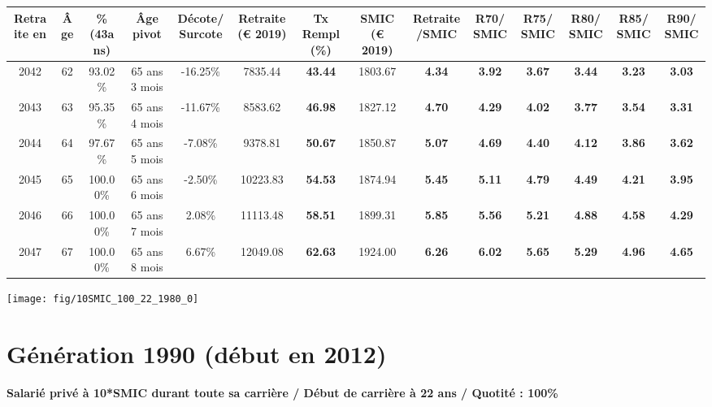\begin{adjustbox}{max width=\textwidth} 
\begin{tabular}[htb]{|c|c||c|c|c||c|c||c|c||c|c|c|c|c|} 
\hline 
 Retraite en &  Âge &  \%(43ans) &  Âge pivot &  Décote/Surcote &  Retraite (\euro{} 2019) &  Tx Rempl(\%) &  SMIC (\euro{} 2019) &  Retraite/SMIC &  R70/SMIC &  R75/SMIC &  R80/SMIC &  R85/SMIC &  R90/SMIC \\ 
\hline \hline 
 2042 &  62 &  93.02\% &  65 ans 3 mois &  -16.25\% &  7835.44 &  {\bf 43.44} &  1803.67 &  {\bf 4.34} &  {\bf 3.92} &  {\bf 3.67} &  {\bf 3.44} &  {\bf 3.23} &  {\bf 3.03} \\ 
\hline 
 2043 &  63 &  95.35\% &  65 ans 4 mois &  -11.67\% &  8583.62 &  {\bf 46.98} &  1827.12 &  {\bf 4.70} &  {\bf 4.29} &  {\bf 4.02} &  {\bf 3.77} &  {\bf 3.54} &  {\bf 3.31} \\ 
\hline 
 2044 &  64 &  97.67\% &  65 ans 5 mois &  -7.08\% &  9378.81 &  {\bf 50.67} &  1850.87 &  {\bf 5.07} &  {\bf 4.69} &  {\bf 4.40} &  {\bf 4.12} &  {\bf 3.86} &  {\bf 3.62} \\ 
\hline 
 2045 &  65 &  100.00\% &  65 ans 6 mois &  -2.50\% &  10223.83 &  {\bf 54.53} &  1874.94 &  {\bf 5.45} &  {\bf 5.11} &  {\bf 4.79} &  {\bf 4.49} &  {\bf 4.21} &  {\bf 3.95} \\ 
\hline 
 2046 &  66 &  100.00\% &  65 ans 7 mois &  2.08\% &  11113.48 &  {\bf 58.51} &  1899.31 &  {\bf 5.85} &  {\bf 5.56} &  {\bf 5.21} &  {\bf 4.88} &  {\bf 4.58} &  {\bf 4.29} \\ 
\hline 
 2047 &  67 &  100.00\% &  65 ans 8 mois &  6.67\% &  12049.08 &  {\bf 62.63} &  1924.00 &  {\bf 6.26} &  {\bf 6.02} &  {\bf 5.65} &  {\bf 5.29} &  {\bf 4.96} &  {\bf 4.65} \\ 
\hline 
\hline 
\end{tabular} 
\end{adjustbox} 
 
 \vspace{0.1cm} 

 {\hspace{-2.2cm}\texttt{[image: fig/10SMIC\_100\_22\_1980\_0]}} 

\newpage 
 
\section{Génération 1990 (début en 2012)\label{10SMIC_100_22_1990_0}} 
 
{\bf \noindent Salarié privé à 10*SMIC durant toute sa carrière / Début de carrière à 22 ans / Quotité : 100\%}  ~ 

